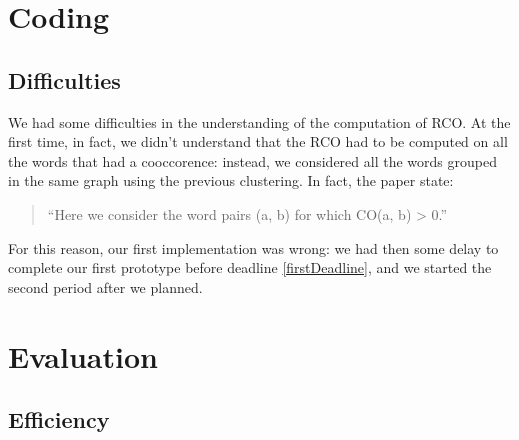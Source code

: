 \documentclass[10pt,a4paper]{article}
\begin{document}
\section{Coding}
\subsection{Difficulties}
We had some difficulties in the understanding of the computation of RCO. At the first time, in fact, we didn't understand that the RCO had to be computed on all the words that had a cooccorence: instead, we considered all the words grouped in the same graph using the previous clustering. In fact, the paper state:
\begin{quotation}
``Here we consider the word pairs (a, b) for which CO(a, b) > 0.''
\end{quotation}
For this reason, our first implementation was wrong: we had then some delay to complete our first prototype before deadline \ref{firstDeadline}, and we started the second period after we planned.
\section{Evaluation}
\subsection{Efficiency}
\end{document}
